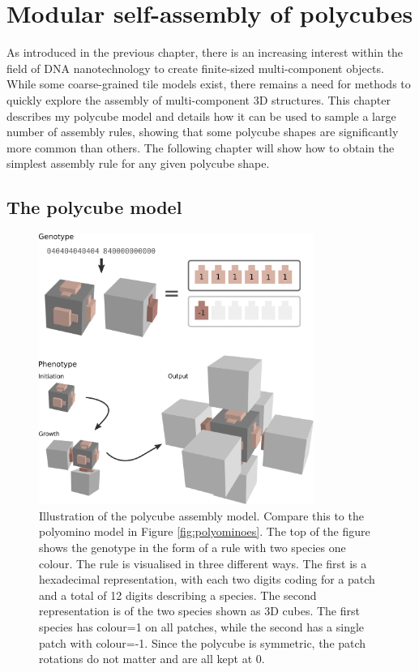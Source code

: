 \chapter{\label{ch:3-polycubes}Modular self-assembly of polycubes}

\minitoc

As introduced in the previous chapter, there is an increasing interest within the field of DNA nanotechnology to create finite-sized multi-component objects. While some coarse-grained tile models exist, there remains a need for methods to quickly explore the assembly of multi-component 3D structures.
This chapter describes my polycube model and details how it can be used to sample a large number of assembly rules, showing that some polycube shapes are significantly more common than others. The following chapter will show how to obtain the simplest assembly rule for any given polycube shape.

\section{The polycube model}

\begin{figure}
    \centering\includegraphics[width=0.8\textwidth]{figures/rule.eps} 
    \caption{Illustration of the polycube assembly model. Compare this to the polyomino model in Figure \ref{fig:polyominoes}. The top of the figure shows the genotype in the form of a rule with two species one colour. The rule is visualised in three different ways. The first is a hexadecimal representation, with each two digits coding for a patch and a total of 12 digits describing a species. The second representation is of the two species shown as 3D cubes. The first species has colour=1 on all patches, while the second has a single patch with colour=-1. Since the polycube is symmetric, the patch rotations do not matter and are all kept at 0.}
    \label{fig:polycubeRule}\end{figure}


